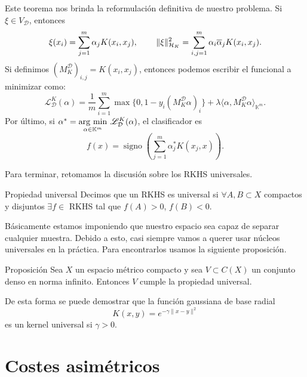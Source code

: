 \documentclass{beamer}
\begin{document}
\begin{frame}
    Este teorema nos brinda la reformulación definitiva de nuestro problema. Si \(\xi \in V_{\mathcal{D}}\), entonces
    \[
    \xi(x_i) = \sum_{j=1}^m \alpha_j K(x_i,x_j), \hspace{0.3in}
    \lVert \xi \rVert_{\mathcal{H}_K}^2 = \sum_{i,j=1}^m \alpha_i \overline{\alpha}_j K(x_i,x_j).
    \]
    Si definimos \((M_K^{\mathcal{D}})_{i,j} = K(x_i,x_j)\), entonces podemos escribir el funcional a minimizar como:
    \[
        \mathscr{L}_{\mathcal{D}}^K(\alpha) = \frac{1}{m} \sum_{i=1}^m \max\{0,1-y_i (M_K^{\mathcal{D}}\alpha)_i\} + \lambda \langle \alpha, M_K^{\mathcal{D}} \alpha\rangle_{\mathbb{K}^m}.
    \]
    Por último, si \(\alpha^\ast = \underset{\alpha \in \mathbb{K}^m} {\mathrm{arg\,\min}} \hspace{0.05in} \mathscr{L}_{\mathcal{D}}^K(\alpha)\), el clasificador es
    \[
    f(x) = \operatorname{signo} \left( \sum_{j=1}^m \alpha_j^\ast K(x_j,x) \right).
    \]
\end{frame}

\begin{frame}
    Para terminar, retomamos la discusión sobre los RKHS universales.
    \begin{block}{Propiedad universal}
       Decimos que un RKHS es universal si \(\forall A, B \subset X\) compactos y disjuntos \(\exists f \in\) RKHS tal que \(f(A) > 0\), \(f(B) < 0\).
    \end{block}
    Básicamente estamos imponiendo que nuestro espacio sea capaz de separar cualquier muestra. Debido a esto, casi siempre vamos a querer usar núcleos universales en la práctica. Para encontrarlos usamos la siguiente proposición.
    \begin{block}{Proposición}
        Sea \(X\) un espacio métrico compacto y sea \(V \subset C(X)\) un conjunto denso en norma infinito. Entonces \(V\) cumple la propiedad universal.
    \end{block}
    De esta forma se puede demostrar que la función gaussiana de base radial
    \[
    K(x,y) = e^{-\gamma\lVert x-y \rVert^2}
    \]
    es un kernel universal si \(\gamma > 0\).
\end{frame}

\section{Costes asimétricos}
\end{document}
